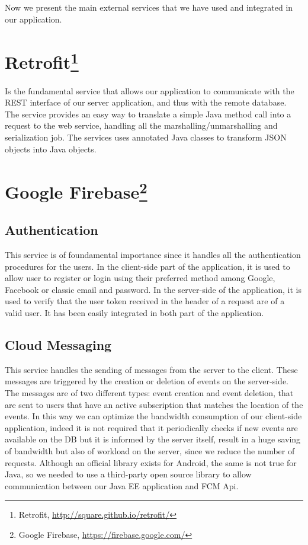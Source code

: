\documentclass[a4paper]{scrreprt}
\begin{document}
\bigskip Now we present the main external services that we have used and integrated in our application.

\section[Retrofit]{Retrofit\footnote{Retrofit, \url{http://square.github.io/retrofit/}}}
Is the fundamental service that allows our application to communicate with the REST interface of our server application, and thus with the remote database. The service provides an easy way to translate a simple Java method call into a request to the web service, handling all the marshalling/unmarshalling and serialization job. The services uses annotated Java classes to transform JSON objects into Java objects.

\section[Google Firebase]{Google Firebase\footnote{Google Firebase, \url{https://firebase.google.com/}}}

\subsection{Authentication}
This service is of foundamental importance since it handles all the authentication procedures for the users. In the client-side part of the application, it is used to allow user to register or login using their preferred method among Google, Facebook or classic email and password. In the server-side of the application, it is used to verify that the user token received in the header of a request are of a valid user. It has been easily integrated in both part of the application.

\subsection{Cloud Messaging}
This service handles the sending of messages from the server to the client. These messages are triggered by the creation or deletion of events on the server-side. The messages are of two different types: event creation and event deletion, that are sent to users that have an active subscription that matches the location of the events. In this way we can optimize the bandwidth consumption of our client-side application, indeed it is not required that it periodically checks if new events are available on the DB but it is informed by the server itself, result in a huge saving of bandwidth but also of workload on the server, since we reduce the number of requests. Although an official library exists for Android, the same is not true for Java, so we needed to use a third-party open source library to allow communication between our Java EE application and FCM Api.
\end{document}
